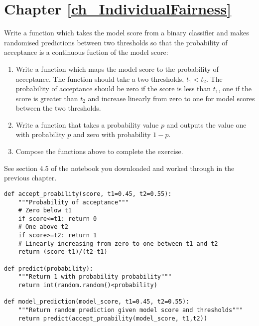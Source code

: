 \section{Chapter \ref{ch_IndividualFairness}}\label{sec_app_IFSolutions}


\begin{lookbox}
\hypertarget{IF_RandPreds}{}
Write a function which takes the model score from a binary classifier and makes randomised predictions between two thresholds so that the probability of acceptance is a continuous fuction of the model score:
\begin{enumerate}[leftmargin=*]
\item Write a function which maps the model score to the probability of acceptance. The function should take a two thresholds, $t_1<t_2$. The probability of acceptance should be zero if the score is less than $t_1$, one if the score is greater than $t_2$ and increase linearly from zero to one for model scores between the two thresholds.
\item Write a function that takes a probability value $p$ and outputs the value one with probability $p$ and zero with probability $1-p$.
\item Compose the functions above to complete the exercise.
\end{enumerate}
See section 4.5 of the notebook you downloaded and worked through in the previous chapter.
\end{lookbox}

\begin{lstlisting}[caption={Randomising predictions between two thresholds}, label=lst:RandPreds]
def accept_proability(score, t1=0.45, t2=0.55):
    """Probability of acceptance"""
    # Zero below t1
    if score<=t1: return 0
    # One above t2
    if score>=t2: return 1
    # Linearly increasing from zero to one between t1 and t2
    return (score-t1)/(t2-t1)

def predict(probability):
    """Return 1 with probability probability"""
    return int(random.random()<probability)

def model_prediction(model_score, t1=0.45, t2=0.55):
    """Return random prediction given model score and thresholds"""
    return predict(accept_proability(model_score, t1,t2))
\end{lstlisting}


